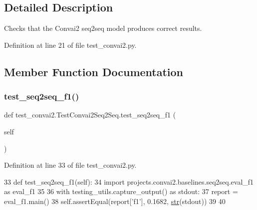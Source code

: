 \subsection{Detailed Description}
\begin{DoxyVerb}Checks that the Convai2 seq2seq model produces correct results.
\end{DoxyVerb}
 

Definition at line 21 of file test\+\_\+convai2.\+py.



\subsection{Member Function Documentation}
\mbox{\label{classtest__convai2_1_1TestConvai2Seq2Seq_af92bc095f0d62a64388b736f06b003a6}} 
\subsubsection{\texorpdfstring{test\+\_\+seq2seq\+\_\+f1()}{test\_seq2seq\_f1()}}
{\footnotesize\ttfamily def test\+\_\+convai2.\+Test\+Convai2\+Seq2\+Seq.\+test\+\_\+seq2seq\+\_\+f1 (\begin{DoxyParamCaption}\item[{}]{self }\end{DoxyParamCaption})}



Definition at line 33 of file test\+\_\+convai2.\+py.


\begin{DoxyCode}
33     \textcolor{keyword}{def }test\_seq2seq\_f1(self):
34         \textcolor{keyword}{import} projects.convai2.baselines.seq2seq.eval\_f1 \textcolor{keyword}{as} eval\_f1
35 
36         with testing\_utils.capture\_output() \textcolor{keyword}{as} stdout:
37             report = eval\_f1.main()
38         self.assertEqual(report[\textcolor{stringliteral}{'f1'}], 0.1682, \hyperlink{namespacegenerate__task__READMEs_a5b88452ffb87b78c8c85ececebafc09f}{str}(stdout))
39 
40 
\end{DoxyCode}
\mbox{\label{classtest__convai2_1_1TestConvai2Seq2Seq_ae1f1ed9b54523ecf62a983e6d0ae1bb2}} 
